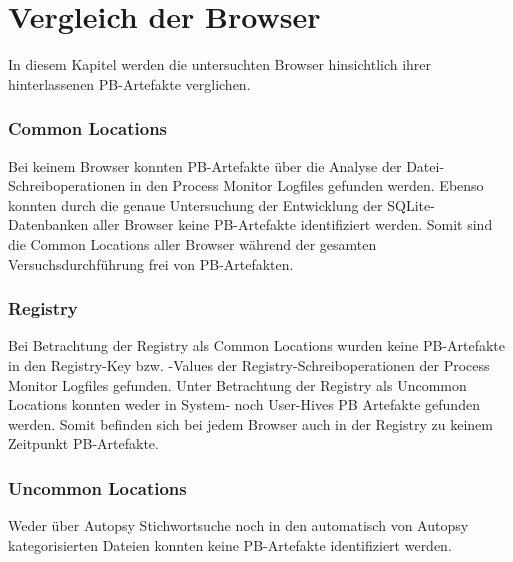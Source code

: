 \chapter{Vergleich der Browser}
\label{chapter:vergleich-der-browser}

In diesem Kapitel werden die untersuchten Browser hinsichtlich ihrer hinterlassenen PB-Artefakte verglichen.

\subsection*{Common Locations}
Bei keinem Browser konnten PB-Artefakte über die Analyse der Datei-Schreiboperationen in den Process Monitor Logfiles gefunden werden.
Ebenso konnten durch die genaue Untersuchung der Entwicklung der SQLite-Datenbanken aller Browser keine PB-Artefakte identifiziert werden.
Somit sind die Common Locations aller Browser während der gesamten Versuchsdurchführung frei von PB-Artefakten.

\subsection*{Registry}
Bei Betrachtung der Registry als Common Locations wurden keine PB-Artefakte in den Registry-Key bzw. -Values der Registry-Schreiboperationen der Process Monitor Logfiles gefunden.
Unter Betrachtung der Registry als Uncommon Locations konnten weder in System- noch User-Hives PB Artefakte gefunden werden.
Somit befinden sich bei jedem Browser auch in der Registry zu keinem Zeitpunkt PB-Artefakte.

\subsection*{Uncommon Locations}
Weder über Autopsy Stichwortsuche noch in den automatisch von Autopsy kategorisierten Dateien konnten keine PB-Artefakte identifiziert werden.

